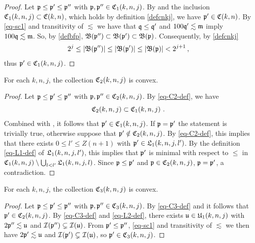 \begin{proof}
    \leanok
    Let ${\mathfrak p}\le{\mathfrak p}'\le{\mathfrak p}''$ with ${\mathfrak p}, {\mathfrak p}'' \in {\mathfrak C}_1(k,n,j)$. By  and the inclusion ${\mathfrak C}_1(k,n,j) \subset {\mathfrak C}(k,n)$, which holds by definition \eqref{defcnkj}, we have ${\mathfrak p}' \in {\mathfrak C}(k,n)$. By \eqref{eq-sc1} and transitivity of $\lesssim$ we have that ${\mathfrak q} \le {\mathfrak q}'$ and $100 {\mathfrak q}' \lesssim \mathfrak{m}$ imply $100 {\mathfrak q} \lesssim \mathfrak{m}$. So, by \eqref{defbfp}, $\mathfrak{B}({\mathfrak p}'') \subset \mathfrak{B}({\mathfrak p}') \subset \mathfrak{B}({\mathfrak p})$. Consequently, by \eqref{defcnkj}
    $$
        2^j \le |\mathfrak{B}({\mathfrak p}'')|\le |\mathfrak{B}({\mathfrak p}')| \le |\mathfrak{B}({\mathfrak p})| < 2^{j+1}\,,
    $$
    thus ${\mathfrak p}' \in {\mathfrak C}_1(k,n,j)$.
\end{proof}

\begin{lemma}[C2 convex]
    \label{C2-convex}
    \leanok
    For each $k,n,j$, the collection ${\mathfrak C}_2(k,n,j)$ is convex.
\end{lemma}

\begin{proof}
    \leanok
     Let ${\mathfrak p} \le {\mathfrak p}' \le {\mathfrak p}''$ with ${\mathfrak p}, {\mathfrak p}'' \in {\mathfrak C}_2(k,n,j)$. By \eqref{eq-C2-def}, we have
     \begin{equation*}
         \fC_2(k,n,j) \subset \fC_1(k,n,j)\ .
     \end{equation*} Combined with , it follows that ${\mathfrak p}' \in {\mathfrak C}_1(k,n,j)$.
     If ${\mathfrak p}={\mathfrak p}'$ the statement is trivially true, otherwise suppose that ${\mathfrak p}' \notin {\mathfrak C}_2(k,n,j)$.
     By \eqref{eq-C2-def}, this implies that there exists $0 \le l' \le Z(n+1)$ with ${\mathfrak p}' \in {\mathfrak L}_1(k,n,j,l')$.
     By the definition \eqref{eq-L1-def} of ${\mathfrak L}_1(k,n,j,l')$, this implies that ${\mathfrak p}'$ is minimal
     with respect to $\le$ in ${\mathfrak C}_1(k,n,j) \setminus \bigcup_{l < l'} {\mathfrak L}_1(k,n,j,l)$.
     Since ${\mathfrak p}\le{\mathfrak p}'$ and ${\mathfrak p}\in{\mathfrak C}_2(k,n,j)$, ${\mathfrak p}={\mathfrak p}'$, a contradiction.
\end{proof}

\begin{lemma}[C3 convex]
    \label{C3-convex}
    \leanok
    For each $k,n,j$, the collection ${\mathfrak C}_3(k,n,j)$ is convex.
\end{lemma}

\begin{proof}
    \leanok
    Let ${\mathfrak p} \le {\mathfrak p}' \le {\mathfrak p}''$ with ${\mathfrak p}, {\mathfrak p}'' \in {\mathfrak C}_3(k,n,j)$.
    By \eqref{eq-C3-def} and  it follows that ${\mathfrak p}' \in {\mathfrak C}_2(k,n,j)$.
    By \eqref{eq-C3-def} and \eqref{eq-L2-def}, there exists ${\mathfrak u} \in {\mathfrak U}_1(k,n,j)$ with
    $2{\mathfrak p}'' \lesssim {\mathfrak u}$ and ${\mathcal{I}}({\mathfrak p}'') \subsetneq {\mathcal{I}}({\mathfrak u})$. From ${\mathfrak p}' \le {\mathfrak p}''$,
    \eqref{eq-sc1} and transitivity of $\lesssim$ we then have
    $2{\mathfrak p}' \lesssim {\mathfrak u}$ and ${\mathcal{I}}({\mathfrak p}') \subsetneq {\mathcal{I}}({\mathfrak u})$, so ${\mathfrak p}' \in {\mathfrak C}_3(k,n,j)$.
\end{proof}

